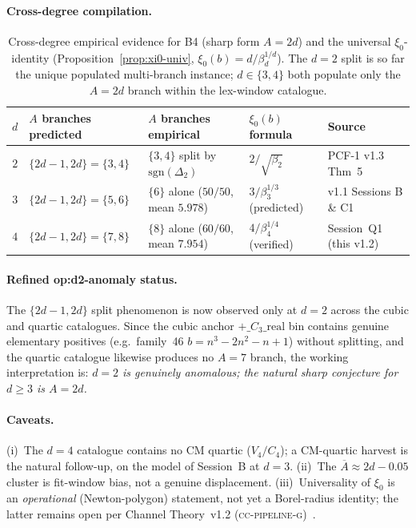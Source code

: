 \documentclass[11pt,a4paper]{article}
\theoremstyle{definition}
\theoremstyle{remark}
\begin{document}
\paragraph{Cross-degree compilation.}
\begin{table}[ht]
\centering
\small
\begin{tabular}{cllll}
\toprule
$d$ & $A$ branches predicted & $A$ branches empirical
    & $\xi_{0}(b)$ formula & Source \\
\midrule
$2$ & $\{2d-1,2d\}=\{3,4\}$ & $\{3,4\}$ split by $\mathrm{sgn}(\Delta_{2})$
    & $2/\sqrt{\beta_{2}}$ & PCF-1 v1.3 Thm~5 \\
$3$ & $\{2d-1,2d\}=\{5,6\}$ & $\{6\}$ alone ($50/50$, mean $5.978$)
    & $3/\beta_{3}^{1/3}$ (predicted) & v1.1 Sessions B \& C1 \\
$4$ & $\{2d-1,2d\}=\{7,8\}$ & $\{8\}$ alone ($60/60$, mean $7.954$)
    & $4/\beta_{4}^{1/4}$ (verified) & Session~Q1 (this v1.2) \\
\bottomrule
\end{tabular}
\caption{Cross-degree empirical evidence for B4 (sharp form $A=2d$)
and the universal $\xi_{0}$-identity (Proposition~\ref{prop:xi0-univ},
$\xi_{0}(b)=d/\beta_{d}^{1/d}$). The $d=2$ split is so far the unique
populated multi-branch instance; $d\in\{3,4\}$ both populate only the
$A=2d$ branch within the lex-window catalogue.}
\label{tab:cross-degree-q1}
\end{table}

\paragraph{Refined op:d2-anomaly status.}
The $\{2d-1,2d\}$ split phenomenon is now observed only at $d=2$
across the cubic and quartic catalogues. Since the cubic anchor
$+\_C_{3}\_\mathrm{real}$ bin contains genuine elementary positives
(e.g.\ family~46 $b=n^{3}-2n^{2}-n+1$) without splitting, and the
quartic catalogue likewise produces no $A=7$ branch, the working
interpretation is: \emph{$d=2$ is genuinely anomalous; the natural
sharp conjecture for $d\ge 3$ is $A=2d$.}

\paragraph{Caveats.}
(i)~The $d=4$ catalogue contains no CM quartic ($V_{4}/C_{4}$); a
CM-quartic harvest is the natural follow-up, on the model of
Session~B at $d=3$. (ii)~The $\overline{A}\approx 2d-0.05$ cluster
is fit-window bias, not a genuine displacement. (iii)~Universality
of $\xi_{0}$ is an \emph{operational} (Newton-polygon) statement,
not yet a Borel-radius identity; the latter remains open per
Channel Theory~v1.2 (\textsc{cc-pipeline-g})~\cite{Papanokechi2026Channel}.
\end{document}
